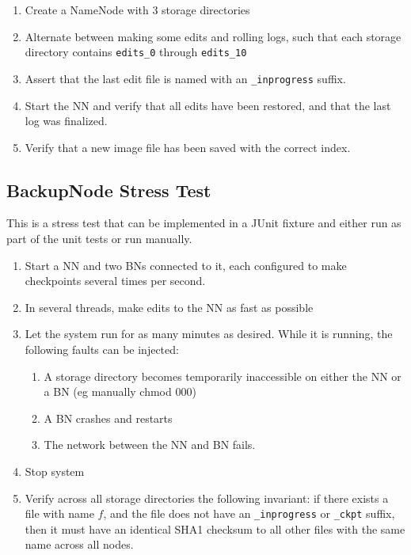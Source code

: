 \documentclass{article}
\begin{document}
\begin{enumerate}
\item Create a NameNode with 3 storage directories
\item Alternate between making some edits and rolling logs, such that each storage directory contains {\tt edits\_0} through {\tt edits\_10}
\item Assert that the last edit file is named with an {\tt \_inprogress} suffix.
\item Start the NN and verify that all edits have been restored, and that the last log was finalized.
\item Verify that a new image file has been saved with the correct index.
\end{enumerate}

\subsection{BackupNode Stress Test}

This is a stress test that can be implemented in a JUnit fixture and either run as part of the unit tests or run manually.

\begin{enumerate}
\item Start a NN and two BNs connected to it, each configured to make checkpoints several times per second.
\item In several threads, make edits to the NN as fast as possible
\item Let the system run for as many minutes as desired. While it is running, the following faults can be injected:
  \begin{enumerate}
  \item A storage directory becomes temporarily inaccessible on either the NN or a BN (eg manually chmod 000)
  \item A BN crashes and restarts
  \item The network between the NN and BN fails.
  \end{enumerate}
\item Stop system
\item Verify across all storage directories the following invariant: if there exists a file with name $f$, and the file does not have an {\tt \_inprogress} or {\tt \_ckpt} suffix, then it must have an identical SHA1 checksum to all other files with the same name across all nodes.
\end{enumerate}
\end{document}
